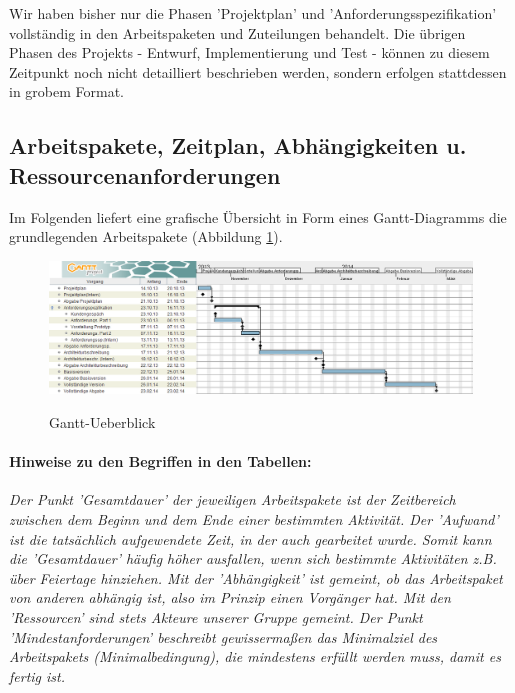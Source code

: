 \documentclass[fontsize=12pt,paper=a4,twoside]{scrartcl}
\begin{document}
Wir haben bisher nur die Phasen 'Projektplan' und 'Anforderungsspezifikation' vollständig in den Arbeitspaketen und Zuteilungen behandelt. Die übrigen Phasen des Projekts - Entwurf, Implementierung und Test - können zu diesem Zeitpunkt noch nicht detailliert beschrieben werden, sondern erfolgen stattdessen in grobem Format. \\

\subsection{Arbeitspakete, Zeitplan, Abhängigkeiten u. Ressourcenanforderungen}\label{aps}

Im Folgenden liefert eine grafische Übersicht in Form eines Gantt-Diagramms die grundlegenden Arbeitspakete (Abbildung \ref{Gantt-Ueberblick}).\\

\begin{figure}[htbp]
\caption{Gantt-Ueberblick}
\includegraphics[scale=0.4]{Gantt-Ueberblick.png}
\label{Gantt-Ueberblick}
\end{figure}

\paragraph{Hinweise zu den Begriffen in den Tabellen:} \textit{Der Punkt 'Gesamtdauer' der jeweiligen Arbeitspakete ist der Zeitbereich zwischen dem Beginn und dem Ende einer bestimmten Aktivität. Der 'Aufwand' ist die tatsächlich aufgewendete Zeit, in der auch gearbeitet wurde. Somit kann die 'Gesamtdauer' häufig höher ausfallen, wenn sich bestimmte Aktivitäten z.B. über Feiertage hinziehen. Mit der 'Abhängigkeit' ist gemeint, ob das Arbeitspaket von anderen abhängig ist, also im Prinzip einen Vorgänger hat. Mit den 'Ressourcen' sind stets Akteure unserer Gruppe gemeint. Der Punkt 'Mindestanforderungen' beschreibt gewissermaßen das Minimalziel des Arbeitspakets (Minimalbedingung), die mindestens erfüllt werden muss, damit es fertig ist.}\\
\end{document}
